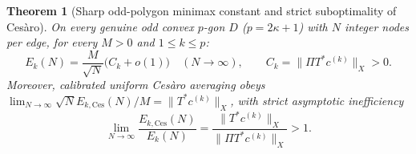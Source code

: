 \documentclass[11pt,reqno]{amsart}
\newtheorem{theorem}{Theorem}[section]
\theoremstyle{definition}
\theoremstyle{remark}
\begin{document}
\begin{theorem}[Sharp odd-polygon minimax constant and strict suboptimality of Ces\`aro]\label{thm:odd-constant}
On every genuine odd convex $p$-gon $D$ ($p = 2\kappa+1$) with $N$ integer nodes per edge, for every $M > 0$ and $1 \le k \le p$:
\begin{equation}\label{eq:odd-asymp}
  E_k(N) = \frac{M}{\sqrt{N}}\bigl(C_k + o(1)\bigr) \quad (N \to \infty), \qquad
  C_k = \|\Pi T^* c^{(k)}\|_X > 0.
\end{equation}
Moreover, calibrated uniform Ces\`aro averaging obeys $\lim_{N\to\infty} \sqrt{N} E_{k,\mathrm{Ces}}(N)/M = \|T^* c^{(k)}\|_X$, with strict asymptotic inefficiency
\begin{equation}\label{eq:cesaro-gap}
  \lim_{N\to\infty} \frac{E_{k,\mathrm{Ces}}(N)}{E_k(N)} = \frac{\|T^* c^{(k)}\|_X}{\|\Pi T^* c^{(k)}\|_X} > 1.
\end{equation}
\end{theorem}
\end{document}
